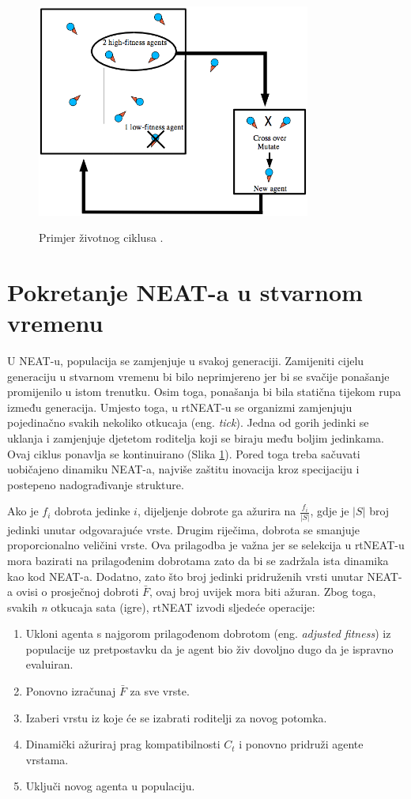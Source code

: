 \documentclass[times, utf8, seminar, numeric]{fer}
\begin{document}
\begin{figure}[ht]
  \centering
  \includegraphics[height=7cm]{slika4}\\
  \caption{Primjer životnog ciklusa \citep{rad4}.}
  \label{slika4}
\end{figure}

\section{Pokretanje NEAT-a u stvarnom vremenu}
U NEAT-u, populacija se zamjenjuje u svakoj generaciji. Zamijeniti cijelu generaciju u stvarnom vremenu bi bilo neprimjereno jer bi se svačije ponašanje promijenilo u istom trenutku. Osim toga, ponašanja bi bila statična tijekom rupa između generacija. Umjesto toga, u rtNEAT-u se organizmi zamjenjuju pojedinačno svakih nekoliko otkucaja (eng. \textit{tick}). Jedna od gorih jedinki se uklanja i zamjenjuje djetetom roditelja koji se biraju među boljim jedinkama. Ovaj ciklus ponavlja se kontinuirano (Slika \ref{slika4}). Pored toga treba sačuvati uobičajeno dinamiku NEAT-a, najviše zaštitu inovacija kroz specijaciju i postepeno nadograđivanje strukture.

Ako je $f_i$ dobrota jedinke $i$, dijeljenje dobrote ga ažurira na $\frac{f_i}{|S|}$, gdje je $|S|$ broj jedinki unutar odgovarajuće vrste. Drugim riječima, dobrota se smanjuje proporcionalno veličini vrste. Ova prilagodba je važna jer se selekcija u rtNEAT-u mora bazirati na prilagođenim dobrotama zato da bi se zadržala ista dinamika kao kod NEAT-a. Dodatno, zato što broj jedinki pridruženih vrsti unutar NEAT-a ovisi o prosječnoj dobroti $\bar{F}$, ovaj broj uvijek mora biti ažuran. Zbog toga, svakih \textit{n} otkucaja sata (igre), rtNEAT izvodi sljedeće operacije:

\begin{enumerate}
  \item Ukloni agenta s najgorom prilagođenom dobrotom (eng. \textit{adjusted fitness}) iz populacije uz pretpostavku da je agent bio živ dovoljno dugo da je ispravno evaluiran.
  \item Ponovno izračunaj $\bar{F}$ za sve vrste.
  \item Izaberi vrstu iz koje će se izabrati roditelji za novog potomka.
  \item Dinamički ažuriraj prag kompatibilnosti $C_t$ i ponovno pridruži agente vrstama.
  \item Uključi novog agenta u populaciju.
\end{enumerate}
\end{document}
